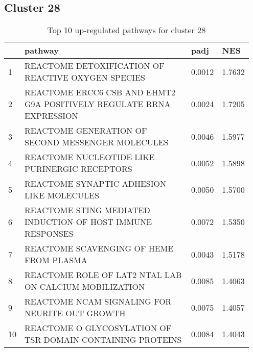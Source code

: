 \documentclass{article}
\begin{document}
\subsection{Cluster 28 }
\begin{table}[H]
\centering
\begin{tabular}{p{0.05\linewidth}p{0.7\linewidth}p{0.1\linewidth}p{0.1\linewidth}}
  \hline
 & pathway & padj & NES \\ 
  \hline
1 & REACTOME DETOXIFICATION OF REACTIVE OXYGEN SPECIES & 0.0012 & 1.7632 \\ 
  2 & REACTOME ERCC6 CSB AND EHMT2 G9A POSITIVELY REGULATE RRNA EXPRESSION & 0.0024 & 1.7205 \\ 
  3 & REACTOME GENERATION OF SECOND MESSENGER MOLECULES & 0.0046 & 1.5977 \\ 
  4 & REACTOME NUCLEOTIDE LIKE PURINERGIC RECEPTORS & 0.0052 & 1.5898 \\ 
  5 & REACTOME SYNAPTIC ADHESION LIKE MOLECULES & 0.0050 & 1.5700 \\ 
  6 & REACTOME STING MEDIATED INDUCTION OF HOST IMMUNE RESPONSES & 0.0072 & 1.5350 \\ 
  7 & REACTOME SCAVENGING OF HEME FROM PLASMA & 0.0043 & 1.5178 \\ 
  8 & REACTOME ROLE OF LAT2 NTAL LAB ON CALCIUM MOBILIZATION & 0.0085 & 1.4063 \\ 
  9 & REACTOME NCAM SIGNALING FOR NEURITE OUT GROWTH & 0.0075 & 1.4057 \\ 
  10 & REACTOME O GLYCOSYLATION OF TSR DOMAIN CONTAINING PROTEINS & 0.0084 & 1.4043 \\ 
   \hline
\end{tabular}
\caption{Top 10 up-regulated pathways for cluster 28} 
\label{tab:q3_2_28}
\end{table}
\end{document}
